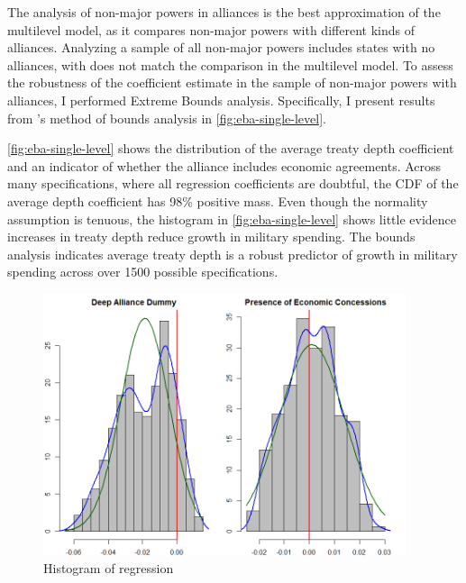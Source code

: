 \documentclass[12pt]{article}
\begin{document}
The analysis of non-major powers in alliances is the best approximation of the multilevel model, as it compares non-major powers with different kinds of alliances. 
Analyzing a sample of all non-major powers includes states with no alliances, with does not match the comparison in the multilevel model. 
To assess the robustness of the coefficient estimate in the sample of non-major powers with alliances, I performed Extreme Bounds analysis. 
Specifically, I present results from \citet{Sala-i-Martin1997}'s method of bounds analysis in \autoref{fig:eba-single-level}. 


\autoref{fig:eba-single-level} shows the distribution of the average treaty depth coefficient and an indicator of whether the alliance includes economic agreements. 
Across many specifications, where all regression coefficients are doubtful, the CDF of the average depth coefficient has 98\% positive mass. 
Even though the normality assumption is tenuous, the histogram in \autoref{fig:eba-single-level} shows little evidence increases in treaty depth reduce growth in military spending. 
The bounds analysis indicates average treaty depth is a robust predictor of growth in military spending across over 1500 possible specifications. 


\begin{figure}[htbp]
	\centering
		\includegraphics[width=0.95\textwidth]{eba-single-level.png}
	\caption{Histogram of regression}
	\label{fig:eba-single-level}
\end{figure}



  
 
\end{document}
